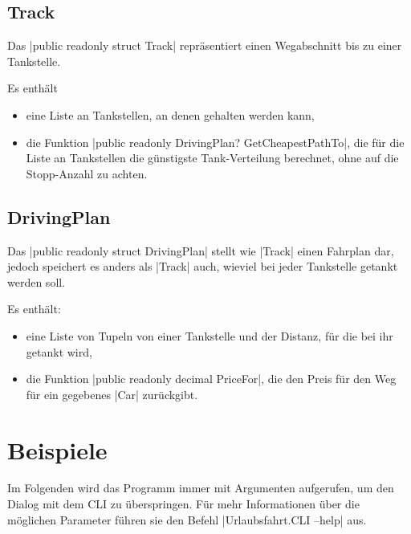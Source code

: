 \documentclass[a4paper,10pt,ngerman]{scrartcl}
\begin{document}
\subsection{Track}
    Das |public readonly struct Track| repräsentiert einen Wegabschnitt bis zu einer Tankstelle.

    Es enthält
    \begin{itemize}
        \item eine Liste an Tankstellen, an denen gehalten werden kann,
        \item die Funktion |public readonly DrivingPlan? GetCheapestPathTo|, die für die Liste an Tankstellen die günstigste Tank-Verteilung berechnet, ohne auf die Stopp-Anzahl zu achten.
    \end{itemize}
    
\subsection{DrivingPlan}
    Das |public readonly struct DrivingPlan| stellt wie |Track| einen Fahrplan dar, jedoch speichert es anders als |Track| auch, wieviel bei jeder Tankstelle getankt werden soll.

    Es enthält:
    \begin{itemize}
        \item eine Liste von Tupeln von einer Tankstelle und der Distanz, für die bei ihr getankt wird,
        \item die Funktion |public readonly decimal PriceFor|, die den Preis für den Weg für ein gegebenes |Car| zurückgibt.
    \end{itemize}

\section{Beispiele}

Im Folgenden wird das Programm immer mit Argumenten aufgerufen, um den Dialog mit dem CLI zu überspringen.
 Für mehr Informationen über die möglichen Parameter führen sie den Befehl |Urlaubsfahrt.CLI --help| aus.
\end{document}
